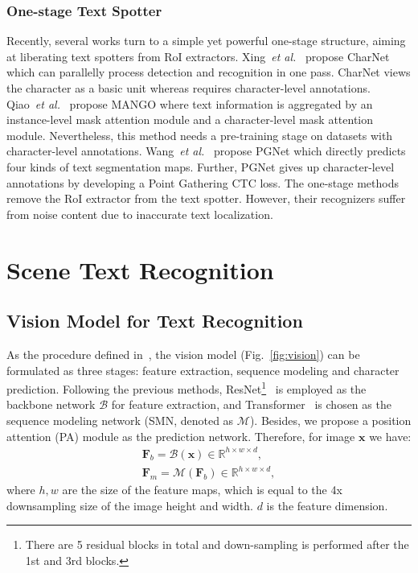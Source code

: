 \documentclass[10pt,journal,compsoc]{IEEEtran}
\def\etal{{\it et al.}\xspace}
\begin{document}
\subsubsection{One-stage Text Spotter}

Recently, several works turn to a simple yet powerful one-stage structure, aiming at liberating text spotters from RoI extractors. Xing~\etal~\cite{xing2019convolutional} propose CharNet which can parallelly process detection and recognition in one pass. CharNet views the character as a basic unit whereas requires character-level annotations. Qiao~\etal~\cite{qiao2021mango} propose MANGO where text information is aggregated by an instance-level mask attention module and a character-level mask attention module. Nevertheless, this method needs a pre-training stage on datasets with character-level annotations. Wang~\etal~\cite{wang2021pgnet} propose PGNet which directly predicts four kinds of text segmentation maps. Further, PGNet gives up character-level annotations by developing a Point Gathering CTC loss. The one-stage methods remove the RoI extractor from the text spotter. However, their recognizers suffer from noise content due to inaccurate text localization.




\section{Scene Text Recognition}
\label{sec:str}

\subsection{Vision Model for Text Recognition}
\label{sec:vision}

As the procedure defined in~\cite{baek2019wrong}, the vision model (Fig.~\ref{fig:vision}) can be formulated as three stages: feature extraction, sequence modeling and character prediction. Following the previous methods, ResNet\footnote{There are 5 residual blocks in total and down-sampling is performed after the 1st and 3rd blocks.}~\cite{shi2018aster, wang2020decoupled} is employed as the backbone network $\mathcal{B}$ for feature extraction, and Transformer~\cite{yu2020towards, lyu20192d} is chosen as the sequence modeling network (SMN, denoted as $\mathcal{M}$). Besides, we propose a position attention (PA) module as the prediction network. Therefore, for image $\bm{x}$ we have:
\begin{align}
\mathbf{F}_b = \mathcal{B}(\bm{x}) \in \mathbb{R}^{h \times w \times d}, \label{eq:vision} \\
\mathbf{F}_m = \mathcal{M}(\mathbf{F}_b) \in \mathbb{R}^{h \times w \times d}, 
\end{align}
where $h,w$ are the size of the feature maps, which is equal to the 4x downsampling size of the image height and width. $d$ is the feature dimension.
\end{document}
